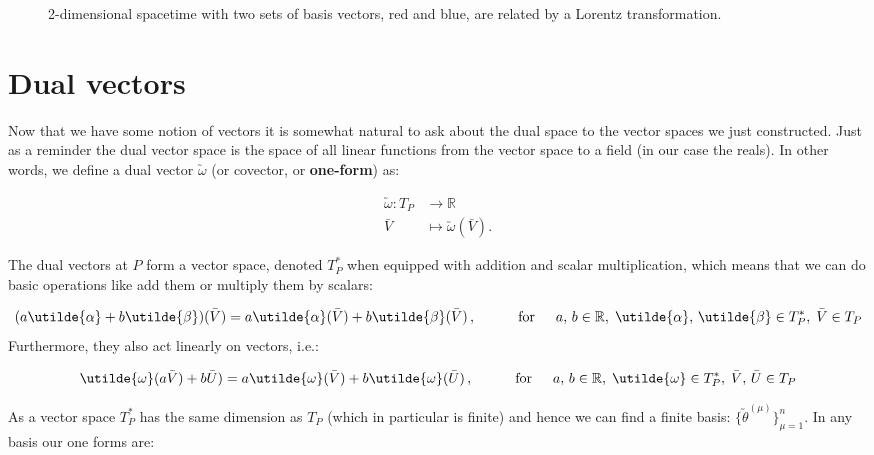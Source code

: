 \documentclass[11pt]{article}
\theoremstyle{plain}
\begin{document}
\begin{figure}[h!]
\begin{centering}
\begin{tikzpicture}[x=0.75pt,y=0.75pt,yscale=-1,xscale=1]
\end{tikzpicture}
\caption{2-dimensional spacetime with two sets of basis vectors, red and blue, are related by a Lorentz transformation.}
\end{centering}
\end{figure}




\newpage

\section{Dual vectors}

Now that we have some notion of vectors it is somewhat natural to ask about the dual space to the vector spaces we just constructed. Just as a reminder the dual vector space is the space of all linear functions from the vector space to a field (in our case the reals). In other words, we define a dual vector $\utilde{\omega}$ (or covector, or \textbf{one-form}) as:

\begin{align*}
  \utilde{\omega} \colon T_{P} &\to \mathbb{R}\\
  \bar{V} &\mapsto \utilde{\omega}(\bar{V}).
\end{align*}

The dual vectors at $P$ form a vector space, denoted $T^{*}_{P}$ when equipped with addition and scalar multiplication, which means that we can do basic operations like add them or multiply them by scalars:

\begin{equation}
(a \utilde{\alpha} + b \utilde{\beta})(\bar{V}) = a \utilde{\alpha}(\bar{V}) + b \utilde{\beta}(\bar{V}) \, , \hspace{3em} \text{for}\hspace{1.5em} a,\, b \in \mathbb{R}, \; \utilde{\alpha}, \, \utilde{\beta} \in T^{*}_{P}, \; \bar{V} \in T_{P}
\end{equation}
Furthermore, they also act linearly on vectors, i.e.:

\begin{equation}
\utilde{\omega} (a \bar{V}) + b \bar{U} ) =a \utilde{\omega} (\bar{V}) + b \utilde{\omega} (\bar{U} )  \, , \hspace{3em} \text{for}\hspace{1.5em} a,\, b \in \mathbb{R}, \; \utilde{\omega}\in T^{*}_{P}, \; \bar{V}, \, \bar{U} \in T_{P}
\end{equation}

As a vector space $T^{*}_{P}$ has the same dimension as $T_{P}$ (which in particular is finite) and hence we can find a finite basis: $\{\utilde{\theta}^{(\mu)} \}_{\mu=1} ^{n}$. In any basis our one forms are:
\end{document}
